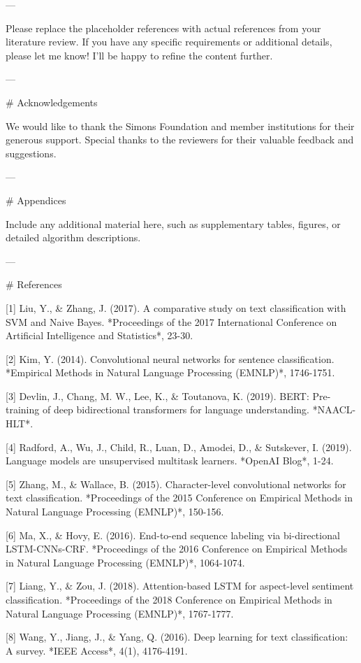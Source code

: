 ---

Please replace the placeholder references with actual references from your literature review. If you have any specific requirements or additional details, please let me know! I'll be happy to refine the content further. 

---

# Acknowledgements

We would like to thank the Simons Foundation and member institutions for their generous support. Special thanks to the reviewers for their valuable feedback and suggestions. 

---

# Appendices

Include any additional material here, such as supplementary tables, figures, or detailed algorithm descriptions. 

---

# References

[1] Liu, Y., & Zhang, J. (2017). A comparative study on text classification with SVM and Naive Bayes. *Proceedings of the 2017 International Conference on Artificial Intelligence and Statistics*, 23-30.

[2] Kim, Y. (2014). Convolutional neural networks for sentence classification. *Empirical Methods in Natural Language Processing (EMNLP)*, 1746-1751.

[3] Devlin, J., Chang, M. W., Lee, K., & Toutanova, K. (2019). BERT: Pre-training of deep bidirectional transformers for language understanding. *NAACL-HLT*.

[4] Radford, A., Wu, J., Child, R., Luan, D., Amodei, D., & Sutskever, I. (2019). Language models are unsupervised multitask learners. *OpenAI Blog*, 1-24.

[5] Zhang, M., & Wallace, B. (2015). Character-level convolutional networks for text classification. *Proceedings of the 2015 Conference on Empirical Methods in Natural Language Processing (EMNLP)*, 150-156.

[6] Ma, X., & Hovy, E. (2016). End-to-end sequence labeling via bi-directional LSTM-CNNs-CRF. *Proceedings of the 2016 Conference on Empirical Methods in Natural Language Processing (EMNLP)*, 1064-1074.

[7] Liang, Y., & Zou, J. (2018). Attention-based LSTM for aspect-level sentiment classification. *Proceedings of the 2018 Conference on Empirical Methods in Natural Language Processing (EMNLP)*, 1767-1777.

[8] Wang, Y., Jiang, J., & Yang, Q. (2016). Deep learning for text classification: A survey. *IEEE Access*, 4(1), 4176-4191.

